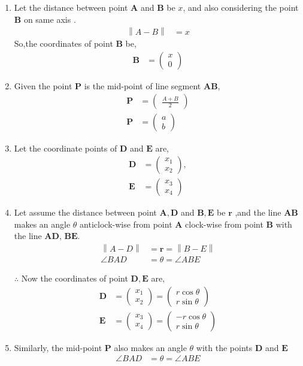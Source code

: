 \documentclass[11pt, a4paper]{article}
\newcommand{\myvec}[1]{\ensuremath{\begin{pmatrix}#1\end{pmatrix}}}
\let\vec\mathbf
\providecommand{\norm}[1]{\left\lVert#1\right\rVert}
\begin{document}
\begin{enumerate}
\begin{enumerate}[label=(\roman*)]
\item Let the distance between point $\vec{A}$ and $\vec{B}$ be $x$, and also considering the point $\vec{B}$ on same axis .
\begin{align}
	\norm{A-B} &= x
\end{align}
				So,the coordinates of point $\vec{B}$ be,
\begin{align}
\vec{B} &= \myvec{x \\ 0}
\end{align}

\item Given the point $\vec{P}$ is the mid-point of line segment $\vec{AB}$,
\begin{align}
	\vec{P} &= \myvec{\frac{A+B}{2}}\\
	\vec{P} &= \myvec{a \\ b}
\end{align}

\item Let the coordinate points of $\vec{D}$ and $\vec{E}$ are,
\begin{align}
\vec{D} &= \myvec{ x_1 \\ x_2},\\
\vec{E} &= \myvec{ x_3 \\ x_4}
\end{align}

\item Let assume the distance between point $\vec{A, D}$ and $\vec{B, E}$ be $\vec{r}$ ,and the line $\vec{AB}$ makes an angle $ \theta $ anticlock-wise from point $\vec{A}$ clock-wise from point $\vec{B}$ with the line $\vec{AD}$, $\vec{BE}$.
\begin{align}
	\norm{A-D} &= \vec{r} = \norm{B-E} \\
	\angle BAD &= \theta = \angle ABE
\end{align}

				$\therefore$ Now the coordinates of point $\vec{D, E}$ are,
\begin{align}
	\vec{D} &= \myvec{ x_1 \\ x_2 } = \myvec{r \cos \theta \\ r\sin \theta} \\
	\vec{E} &= \myvec{ x_3 \\ x_4 } = \myvec{-r \cos \theta \\ r \sin \theta} 
\end{align}

\item Similarly, the mid-point $\vec{P}$ also makes an angle $\theta$ with the points $\vec{D}$ and $\vec{E}$
	\begin{align}
		\angle BAD &= \theta = \angle ABE
	\end{align}


\end{enumerate}
\end{enumerate}
\end{document}
